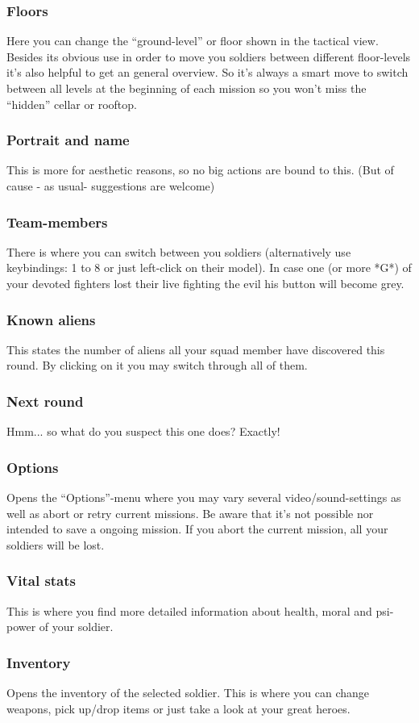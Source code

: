 \subsubsection{Floors}
Here you can change the ``ground-level'' or floor shown in the tactical view. Besides its obvious use in order to move you soldiers between different floor-levels it's also helpful to get an general overview. So it's always a smart move to switch between all levels at the beginning of each mission so you won't miss the ``hidden'' cellar or rooftop.
\subsubsection{Portrait and name}
This is more for aesthetic reasons, so no big actions are bound to this. (But of cause - as usual- suggestions are welcome)
\subsubsection{Team-members}
There is where you can switch between you soldiers (alternatively use keybindings: 1 to 8 or just left-click on their model). In case one (or more *G*) of your devoted fighters lost their live fighting the evil his button will become grey.
\subsubsection{Known aliens}
This states the number of aliens all your squad member have discovered this round. By clicking on it you may switch through all of them.
\subsubsection{Next round}
Hmm... so what do you suspect this one does? Exactly!
\subsubsection{Options}
Opens the ``Options''-menu where you may vary several video/sound-settings as well as abort or retry current missions. Be aware that it's not possible nor intended to save a ongoing mission. If you abort the current mission, all your soldiers will be lost.
\subsubsection{Vital stats}
This is where you find more detailed information about health, moral and psi-power of your soldier.
\subsubsection{Inventory}
Opens the inventory of the selected soldier. This is where you can change weapons, pick up/drop items or just take a look at your great heroes.

